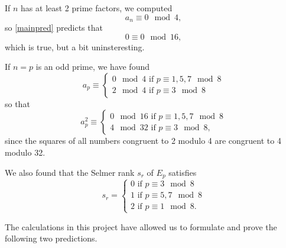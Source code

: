 \documentclass[12pt, a4paper]{report}
\begin{document}
If $n$ has at least 2 prime factors, we computed
\[a_n \equiv 0 \mod{4},\]
so \autoref{mainpred} predicts that
\[0 \equiv 0 \mod{16},\]
which is true, but a bit uninsteresting.

If $n = p$ is an odd prime, we have found
\[a_p \equiv \begin{cases}
    0 \mod{4} \text{ if } p \equiv 1,5,7 \mod{8} \\
    2 \mod{4} \text{ if } p \equiv 3 \mod{8}
  \end{cases}
\]
so that
\[a_p^2 \equiv
  \begin{cases}
    0 \mod{16} \text{ if } p \equiv 1,5,7 \mod{8} \\
    4 \mod {32} \text{ if } p \equiv 3 \mod{8},
  \end{cases}
\]
since the squares of all numbers congruent to 2 modulo 4 are congruent to 4
modulo 32.

We also found that the Selmer rank $s_r$ of
$E_p$ satisfies
\begin{equation*}
  s_r =
  \begin{cases}
    0 \text{ if } p \equiv 3 \mod{8} \\
    1 \text{ if } p \equiv 5,7 \mod{8} \\
    2 \text{ if } p \equiv 1 \mod{8}.
  \end{cases}
\end{equation*}

The calculations in this project have allowed us to formulate and prove the
following two predictions.
\end{document}

